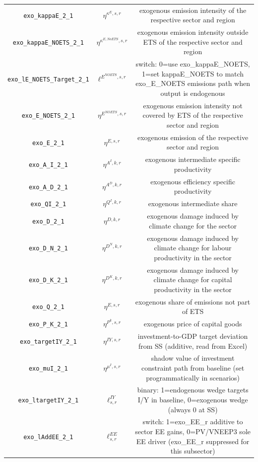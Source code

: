 \begin{center}
\begin{longtable}{ccc}
\texttt{exo\_kappaE\_2\_1} & ${\eta^{\kappa^{E},s,r}}$ & exogenous emission intensity of the respective sector and region\\
\texttt{exo\_kappaE\_NOETS\_2\_1} & ${\eta^{\kappa^{E,No ETS},s,r}}$ & exogenous emission intensity outside ETS of the respective sector and region\\
\texttt{exo\_lE\_NOETS\_Target\_2\_1} & ${\ell^{E^{NOETS},s,r}}$ & switch: 0=use exo\_kappaE\_NOETS, 1=set kappaE\_NOETS to match exo\_E\_NOETS emissions path when output is endogenous\\
\texttt{exo\_E\_NOETS\_2\_1} & ${\eta^{E^{NOETS},s,r}}$ & exogenous emission intensity not covered by ETS of the respective sector and region\\
\texttt{exo\_E\_2\_1} & ${\eta^{E,s,r}}$ & exogenous emission of the respective sector and region\\
\texttt{exo\_A\_I\_2\_1} & ${\eta^{A^{I},k,r}}$ & exogenous intermediate specific productivity\\
\texttt{exo\_A\_D\_2\_1} & ${\eta^{A^{D},k,r}}$ & exogenous efficiency specific productivity\\
\texttt{exo\_QI\_2\_1} & ${\eta^{Q^{I},k,r}}$ & exogenous intermediate share\\
\texttt{exo\_D\_2\_1} & ${\eta^{D,k,r}}$ & exogenous damage induced by climate change for the sector\\
\texttt{exo\_D\_N\_2\_1} & ${\eta^{D^{N},k,r}}$ & exogenous damage induced by climate change for labour productivity in the sector\\
\texttt{exo\_D\_K\_2\_1} & ${\eta^{D^{K},k,r}}$ & exogenous damage induced by climate change for capital productivity in the sector\\
\texttt{exo\_Q\_2\_1} & ${\eta^{E,s,r}}$ & exogenous share of emissions not part of ETS\\
\texttt{exo\_P\_K\_2\_1} & ${\eta^{P^k,s,r}}$ & exogenous price of capital goods\\
\texttt{exo\_targetIY\_2\_1} & ${\eta^{IY,s,r}}$ & investment-to-GDP target deviation from SS (additive, read from Excel)\\
\texttt{exo\_muI\_2\_1} & ${\eta^{\mu^{I},s,r}}$ & shadow value of investment constraint path from baseline (set programmatically in scenarios)\\
\texttt{exo\_ltargetIY\_2\_1} & ${\ell^{IY}_{s,r}}$ & binary: 1=endogenous wedge targets I/Y in baseline, 0=exogenous wedge (always 0 at SS)\\
\texttt{exo\_lAddEE\_2\_1} & ${\ell^{EE}_{s,r}}$ & switch: 1=exo\_EE\_r additive to sector EE gains, 0=PV/VNEEP3 sole EE driver (exo\_EE\_r suppressed for this subsector)\\

\end{longtable}
\end{center}
